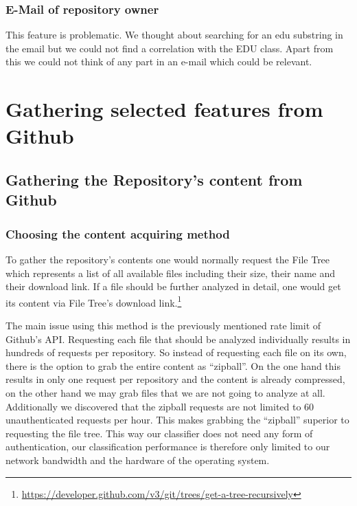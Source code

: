 \documentclass[paper=A4,pagesize=auto,12pt,headinclude=true,footinclude=true,BCOR=0mm,DIV=calc]{scrartcl}
\begin{document}
	\subsubsection{E-Mail of repository owner}
	This feature is problematic. We thought about searching for an edu substring in the email but we could not find a correlation with the EDU class. Apart from this we could not think of any part in an e-mail which could be relevant.
	
	
	
	
	
	\section{Gathering selected features from Github}
	
	\subsection{Gathering the Repository’s content from Github}
	
	\subsubsection{Choosing the content acquiring method}
	
	To gather the repository’s contents one would normally request the File Tree which represents a list of all available files including their size, their name and their download link. If a file should be further analyzed in detail, one would get its content via File Tree’s download link.\footnote{\url{	https://developer.github.com/v3/git/trees/get-a-tree-recursively}}
	
	The main issue using this method is the previously mentioned rate limit of Github’s API. Requesting each file that should be analyzed individually results in hundreds of requests per repository.
	So instead of requesting each file on its own, there is the option to grab the entire content as “zipball”. On the one hand this results in only one request per repository and the content is already compressed, on the other hand we may grab files that we are not going to analyze at all. 
	Additionally we discovered that the zipball requests are not limited to 60 unauthenticated requests per hour. This makes grabbing the “zipball” superior to requesting the file tree. This way our classifier does not need any form of authentication, our classification performance is therefore only limited to our network bandwidth and the hardware of the operating system.
	
\end{document}
